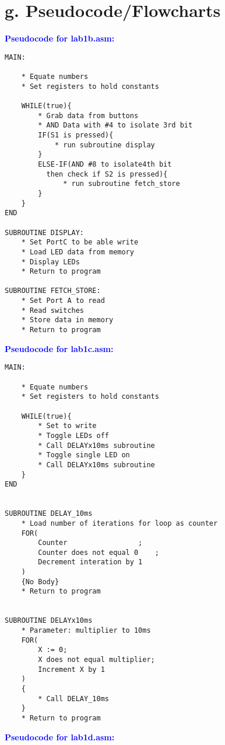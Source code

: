 \documentclass[11pt]{article}
\theoremstyle{plain}
\theoremstyle{definition}
\begin{document}
\section*{g. Pseudocode/Flowcharts}
%
%
\textbf{\textcolor{blue}{Pseudocode for lab1b.asm:}}
\begin{tcolorbox}
\begin{verbatim}
MAIN:

    * Equate numbers
    * Set registers to hold constants
    
    WHILE(true){
        * Grab data from buttons
        * AND Data with #4 to isolate 3rd bit 
        IF(S1 is pressed){
            * run subroutine display	
        }
        ELSE-IF(AND #8 to isolate4th bit 
          then check if S2 is pressed){
              * run subroutine fetch_store
        }
    }
END

SUBROUTINE DISPLAY:
    * Set PortC to be able write
    * Load LED data from memory
    * Display LEDs
    * Return to program

SUBROUTINE FETCH_STORE:
    * Set Port A to read
    * Read switches 
    * Store data in memory
    * Return to program
\end{verbatim}
\end{tcolorbox}
%
%
\newpage
\textbf{\textcolor{blue}{Pseudocode for lab1c.asm:}}
\begin{tcolorbox}
\begin{verbatim}
MAIN:

    * Equate numbers
    * Set registers to hold constants
    
    WHILE(true){
        * Set to write
        * Toggle LEDs off
        * Call DELAYx10ms subroutine
        * Toggle single LED on
        * Call DELAYx10ms subroutine
    }	
END


SUBROUTINE DELAY_10ms
    * Load number of iterations for loop as counter
    FOR( 
        Counter					;
        Counter does not equal 0	;
        Decrement interation by 1	
    )
    {No Body}
    * Return to program


SUBROUTINE DELAYx10ms
    * Parameter: multiplier to 10ms
    FOR(
        X := 0;
        X does not equal multiplier;
        Increment X by 1 
    )
    {
        * Call DELAY_10ms
    }	
    * Return to program	
\end{verbatim}
\end{tcolorbox}
%
%
\newpage
\textbf{\textcolor{blue}{Pseudocode for lab1d.asm:}}
\end{document}
